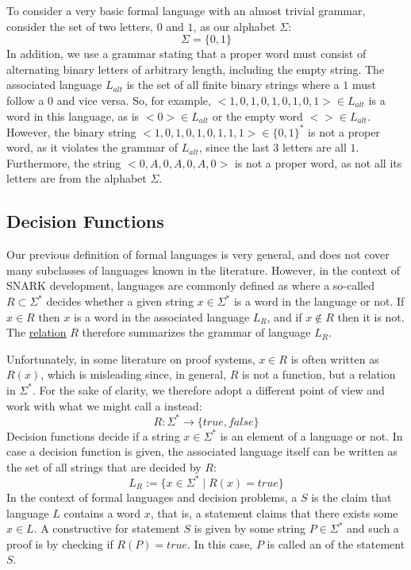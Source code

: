 \begin{example}
\label{ex:alternating_strings_lang}
To consider a very basic formal language with an almost trivial grammar, consider the set  of two letters, $0$ and $1$, as our alphabet $\Sigma$:
$$
\Sigma = \{0,1\}
$$
In addition, we use a grammar stating that a proper word must consist of alternating binary letters of arbitrary length, including the empty string. The associated language $L_{alt}$ is the set of all finite binary strings where a $1$ must follow a $0$ and vice versa. So, for example, $<1,0,1,0,1,0,1,0,1>\in L_{alt}$ is a word in this language, as is $<0>\in L_{alt}$ or the empty word $<>\in L_{alt}$. However, the binary string $<1,0,1,0,1,0,1,1,1>\in \{0,1\}^*$ is not a proper word, as it violates the grammar of $L_{alt}$, since the last 3 letters are all $1$. Furthermore, the string $<0,A,0,A,0,A,0>$ is not a proper word, as not all its letters are from the alphabet $\Sigma$. 
\end{example}

\subsection{Decision Functions}
\label{sec:decision_function}
 Our previous definition of formal languages is very general, and does not cover many subclasses of languages known in the literature. However, in the context of SNARK development, languages are commonly defined as  where a so-called  $R\subset \Sigma^*$ decides whether a given string $x\in \Sigma^*$ is a word in the language or not. If $x\in R$ then $x$ is a word in the associated language $L_R$, and if $x\notin R$ then it is not. The \href{https://en.wikipedia.org/wiki/Relation_(mathematics)}{relation} $R$ therefore summarizes the grammar of language $L_R$.

Unfortunately, in some literature on proof systems, $x\in R$ is often written as $R(x)$, which is  misleading since, in general, $R$ is not a function, but a relation in $\Sigma^*$. For the sake of clarity, we therefore adopt a different point of view and work with what we might call a  instead:
\begin{equation}\label{eq:decision-function}
R: \Sigma^* \to \{true, false\}
\end{equation}
Decision functions decide if a string $x\in \Sigma^*$ is an element of a language or not. In case a decision function is given, the associated language itself can be written as the set of all strings that are decided by $R$:
\begin{equation}
L_R := \{x\in \Sigma^*\;|\; R(x)=true\}
\end{equation}
In the context of formal languages and decision problems, a  $S$ is the claim that language $L$ contains a word $x$, that is, a statement claims that there exists some $x\in L$. A constructive  for statement $S$ is given by some string $P\in \Sigma^*$ and  such a proof is  by checking if $R(P)=true$. In this case, $P$ is called an  of the statement $S$.

